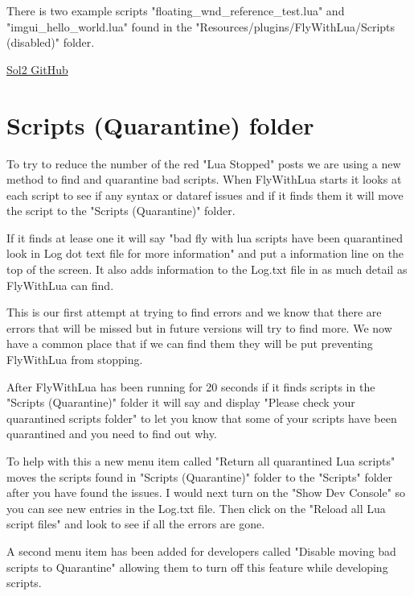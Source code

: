 \documentclass[11pt,parskip=half,a4paper]{scrartcl}
\begin{document}
There is two example scripts "floating\_wnd\_reference\_test.lua" and "imgui\_hello\_world.lua" found in the "Resources/plugins/FlyWithLua/Scripts (disabled)" folder.

\href{https://github.com/ThePhD/sol2}{Sol2 GitHub}


\newpage
\section{Scripts (Quarantine) folder}

To try to reduce the number of the red "Lua Stopped" posts we are using a new method to find and quarantine bad scripts. When FlyWithLua starts it looks at each script to see if any syntax or dataref issues and if it finds them it will move the script to the "Scripts (Quarantine)" folder. \newline

If it finds at lease one it will say "bad fly with lua scripts have been quarantined look in Log dot text file for more information" and put a information line on the top of the screen. It also adds information to the Log.txt file in as much detail as FlyWithLua can find. \newline

This is our first attempt at trying to find errors and we know that there are errors that will be missed but in future versions will try to find more. We now have a common place that if we can find them they will be put preventing FlyWithLua from stopping. \newline

After FlyWithLua has been running for 20 seconds if it finds scripts in the "Scripts (Quarantine)" folder it will say and display "Please check your quarantined scripts folder" to let you know that some of your scripts have been quarantined and you need to find out why. \newline

To help with this a new menu item called "Return all quarantined Lua scripts" moves the scripts found  in "Scripts (Quarantine)" folder to the "Scripts" folder after you have found the issues. I would next turn on the "Show Dev Console" so you can see new entries in the Log.txt file. Then click on the "Reload all Lua script files" and look to see if all the errors are gone. \newline

A second menu item has been added for developers called "Disable moving bad scripts to Quarantine" allowing them to turn off this feature while developing scripts.
\end{document}
